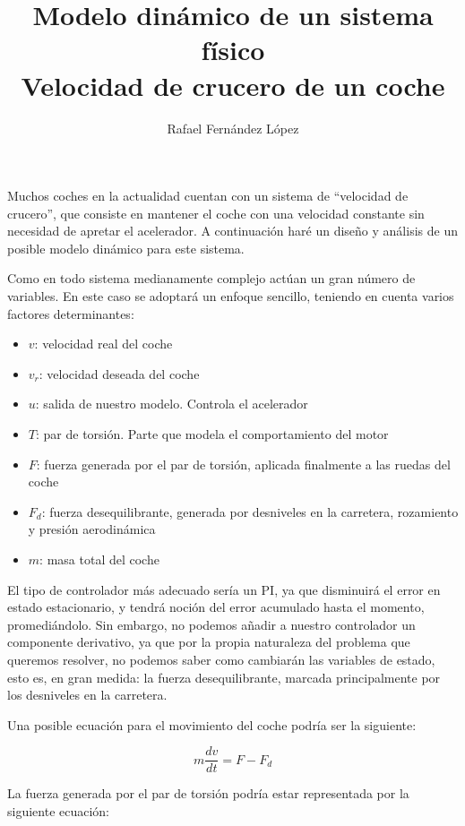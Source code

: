 \documentclass[12pt]{article}
\title{Modelo dinámico de un sistema físico\\Velocidad de crucero de un coche}
\author{Rafael Fernández López}
\date{}
\begin{document}
\maketitle

Muchos coches en la actualidad cuentan con un sistema de ``velocidad de crucero'', que consiste en
mantener el coche con una velocidad constante sin necesidad de apretar el acelerador. A continuación
haré un diseño y análisis de un posible modelo dinámico para este sistema.

Como en todo sistema medianamente complejo actúan un gran número de variables. En este caso se
adoptará un enfoque sencillo, teniendo en cuenta varios factores determinantes:

\begin{itemize}
  \item $v$: velocidad real del coche
  \item $v_r$: velocidad deseada del coche
  \item $u$: salida de nuestro modelo. Controla el acelerador
  \item $T$: par de torsión. Parte que modela el comportamiento del motor
  \item $F$: fuerza generada por el par de torsión, aplicada finalmente a las ruedas del coche
  \item $F_d$: fuerza desequilibrante, generada por desniveles en la carretera, rozamiento y presión
               aerodinámica
  \item $m$: masa total del coche
\end{itemize}

El tipo de controlador más adecuado sería un PI, ya que disminuirá el error en estado estacionario, y
tendrá noción del error acumulado hasta el momento, promediándolo. Sin embargo, no podemos añadir a
nuestro controlador un componente derivativo, ya que por la propia naturaleza del problema que queremos
resolver, no podemos saber como cambiarán las variables de estado, esto es, en gran medida: la fuerza
desequilibrante, marcada principalmente por los desniveles en la carretera.

Una posible ecuación para el movimiento del coche podría ser la siguiente:

\begin{equation}
  m \dfrac{dv}{dt} = F - F_d
\end{equation}

La fuerza generada por el par de torsión podría estar representada por la siguiente ecuación:
\end{document}
